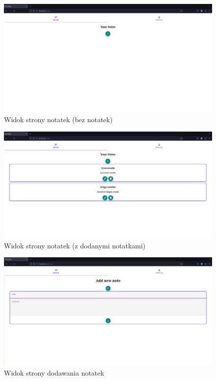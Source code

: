 \documentclass[a4paper,twoside,12pt]{book}
\begin{document}
\begin{figure}[H]
\centering
\includegraphics[width=1.0\textwidth]{./images/strona-notatek.png}
\caption{Widok strony notatek (bez notatek)}
\label{fig:strona-notatek}
\end{figure}

\begin{figure}[H]
\centering
\includegraphics[width=1.0\textwidth]{./images/dodane-notatki.png}
\caption{Widok strony notatek (z dodanymi notatkami)}
\label{fig:strona-notatkek}
\end{figure}

\begin{figure}[H]
\centering
\includegraphics[width=1.0\textwidth]{./images/strona-dodawania-notatek.png}
\caption{Widok strony dodawania notatek}
\label{fig:strona-dodawania-notatek}
\end{figure}
\end{document}
